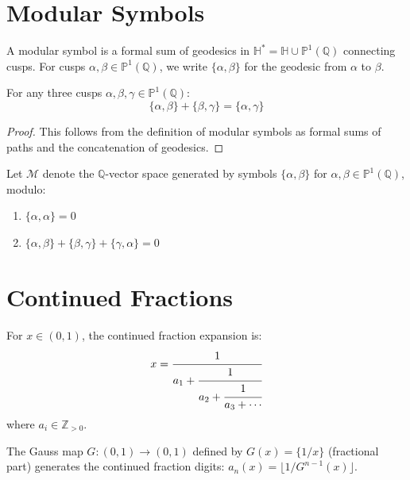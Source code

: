 \documentclass{article}
\begin{document}
\section{Modular Symbols}
\label{sec:modular-symbols}

\begin{definition}
\label{def:modular-symbol}
A modular symbol is a formal sum of geodesics in $\mathbb{H}^* = \mathbb{H} \cup \mathbb{P}^1(\mathbb{Q})$
connecting cusps. For cusps $\alpha, \beta \in \mathbb{P}^1(\mathbb{Q})$, we write
$\{\alpha, \beta\}$ for the geodesic from $\alpha$ to $\beta$.
\end{definition}

\begin{theorem}
\label{thm:three-term}
For any three cusps $\alpha, \beta, \gamma \in \mathbb{P}^1(\mathbb{Q})$:
$$\{\alpha, \beta\} + \{\beta, \gamma\} = \{\alpha, \gamma\}$$
\end{theorem}

\begin{proof}
This follows from the definition of modular symbols as formal sums of paths
and the concatenation of geodesics.
\end{proof}

\begin{definition}
\label{def:symbol-space}
Let $\mathcal{M}$ denote the $\mathbb{Q}$-vector space generated by symbols
$\{\alpha, \beta\}$ for $\alpha, \beta \in \mathbb{P}^1(\mathbb{Q})$, modulo:
\begin{enumerate}
\item $\{\alpha, \alpha\} = 0$
\item $\{\alpha, \beta\} + \{\beta, \gamma\} + \{\gamma, \alpha\} = 0$
\end{enumerate}
\end{definition}

\section{Continued Fractions}
\label{sec:continued-fractions}

\begin{definition}
\label{def:cf-expansion}
For $x \in (0,1)$, the continued fraction expansion is:
$$x = \cfrac{1}{a_1 + \cfrac{1}{a_2 + \cfrac{1}{a_3 + \cdots}}}$$
where $a_i \in \mathbb{Z}_{> 0}$.
\end{definition}

\begin{theorem}
\label{thm:gauss-map}
The Gauss map $G : (0,1) \to (0,1)$ defined by $G(x) = \{1/x\}$ (fractional part)
generates the continued fraction digits: $a_n(x) = \lfloor 1/G^{n-1}(x) \rfloor$.
\end{theorem}
\end{document}
